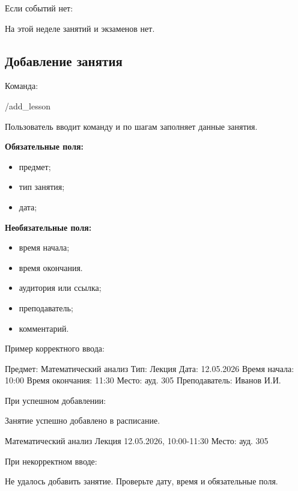 \documentclass[10pt,a4paper,final]{article} %
\begin{document}
Если событий нет:

\begin{Code}
На этой неделе занятий и экзаменов нет.
\end{Code}

\subsection{Добавление занятия}

Команда:

\begin{Code}
/add_lesson
\end{Code}

Пользователь вводит команду  и по шагам заполняет данные занятия.

\textbf{Обязательные поля:}

\begin{itemize}
    \item предмет;
    \item тип занятия;
    \item дата;

\end{itemize}

\textbf{Необязательные поля:}

\begin{itemize}
    \item время начала;
    \item время окончания.
    \item аудитория или ссылка;
    \item преподаватель;
    \item комментарий.
\end{itemize}

Пример корректного ввода:

\begin{Code}
Предмет: Математический анализ
Тип: Лекция
Дата: 12.05.2026
Время начала: 10:00
Время окончания: 11:30
Место: ауд. 305
Преподаватель: Иванов И.И.
\end{Code}

При успешном добавлении:

\begin{Code}
Занятие успешно добавлено в расписание.

Математический анализ
Лекция
12.05.2026, 10:00-11:30
Место: ауд. 305
\end{Code}

При некорректном вводе:

\begin{Code}
Не удалось добавить занятие. Проверьте дату, время и обязательные поля.
\end{Code}
\end{document}
